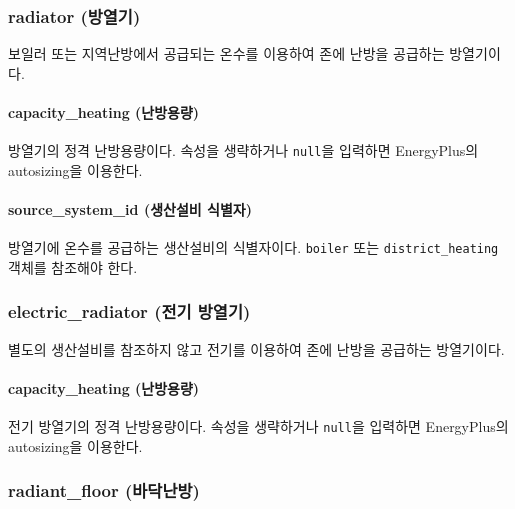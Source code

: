 \subsubsection{radiator (방열기)} \label{subsubsection:ioref:radiator}

보일러 또는 지역난방에서 공급되는 온수를 이용하여 존에 난방을 공급하는 방열기이다.


\paragraph{capacity\_heating (난방용량)} 방열기의 정격 난방용량이다. 속성을 생략하거나 \texttt{null}을 입력하면 EnergyPlus의 autosizing을 이용한다.

\paragraph{source\_system\_id (생산설비 식별자)} 방열기에 온수를 공급하는 생산설비의 식별자이다. \texttt{boiler} 또는 \texttt{district\_heating} 객체를 참조해야 한다.

\subsubsection{electric\_radiator (전기 방열기)} \label{subsubsection:ioref:electricradiator}

별도의 생산설비를 참조하지 않고 전기를 이용하여 존에 난방을 공급하는 방열기이다.


\paragraph{capacity\_heating (난방용량)} 전기 방열기의 정격 난방용량이다. 속성을 생략하거나 \texttt{null}을 입력하면 EnergyPlus의 autosizing을 이용한다.

\subsubsection{radiant\_floor (바닥난방)} \label{subsubsection:ioref:radiantfloor}

